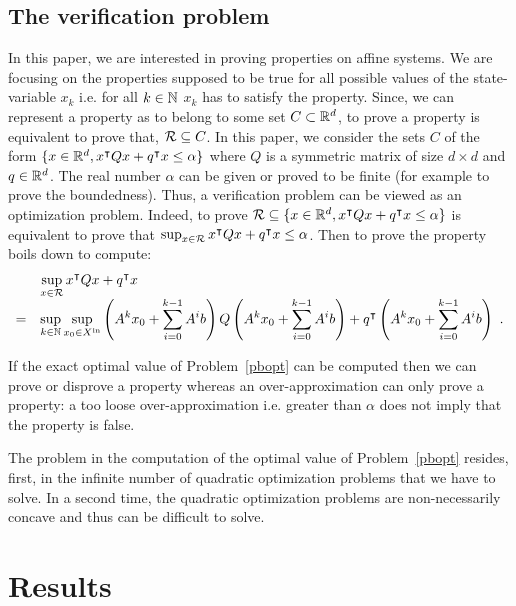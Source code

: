 \documentclass[10pt]{article}
\begin{document}
\subsection{The verification problem}
In this paper, we are interested in proving properties on affine systems. We are focusing on the properties supposed to be true for all possible values of the state-variable $x_k$ i.e. for all $k\in\mathbb{N}$ $x_k$ has to satisfy the property. Since, we can represent a property as to belong to some set $C\subset \mathbb R^d$, to prove a property is equivalent to prove that, $\mathcal{R}\subseteq C$. In this paper, we consider the sets $C$  of the form $\{x\in\mathbb R^d, x^\intercal Q x+q^\intercal x\leq \alpha\}$ where $Q$ is a symmetric matrix of size $d\times d$ and $q\in\mathbb R^d$. The real number $\alpha$ can be given or proved to be finite (for example to prove the boundedness).  Thus, a verification problem can be viewed as an optimization problem. Indeed, to prove $\mathcal{R}\subseteq \{x\in\mathbb R^d, x^\intercal Q x+q^\intercal x\leq \alpha\}$ is equivalent to prove that
$\sup_{x\in\mathcal{R}} x^\intercal Q x+q^\intercal x\leq \alpha$.
Then to prove the property boils down to compute: 
\begin{equation}
\label{pbopt}
\begin{array}{ll}
&\displaystyle{\sup_{x\in\mathcal{R}} x^\intercal Q x+q^\intercal x}\\
=&\displaystyle{\sup_{k\in\mathbb{N}}\sup_{x_0\in X^\mathrm{in}}  \left(A^k x_0+ \sum_{i=0}^{k-1} A^i b \right) Q \left( A^k x_0+ \sum_{i=0}^{k-1} A^i b\right) +q^\intercal \left(A^k x_0+ \sum_{i=0}^{k-1} A^i b\right)}\enspace .
\end{array}
\end{equation} 

If the exact optimal value of Problem~\eqref{pbopt} can be computed then we can prove or disprove a property whereas an over-approximation can only prove a property: a too loose over-approximation i.e. greater than $\alpha$ does not imply that the property is false. 

The problem in the computation of the optimal value of Problem~\eqref{pbopt} resides, first, in the infinite number of quadratic optimization problems that we have to solve. In a second time, the quadratic optimization problems are non-necessarily concave and thus can be difficult to solve. 

\section{Results}
\end{document}
